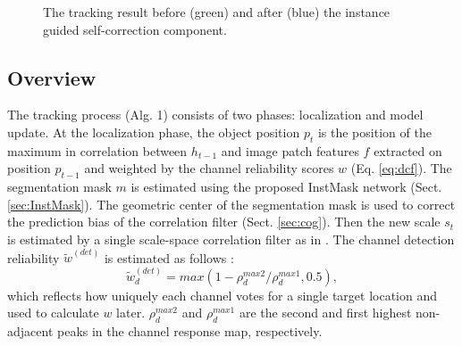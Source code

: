 \documentclass[review]{elsarticle}
\begin{document}
\begin{CJK*}{UTF8}{gbsn}
\begin{figure}
                       \hspace{-0.6em}
                       \hspace{-0.6em}
    \caption{The tracking result before (green) and after (blue) the instance guided self-correction component.}
    \label{fig:IGSC}
\end{figure}

\subsection{Overview}

The tracking process (Alg. 1) consists of two phases: localization and model update. 
At the localization phase,  the object position $p_t$ is the position of the maximum in correlation between $h_{t-1}$ and image patch features $f$ extracted on position $p_{t-1}$ and weighted by the channel reliability scores $w$ (Eq. \ref{eq:dcf}).
The segmentation mask $m$ is estimated using the proposed InstMask network (Sect. \ref{sec:InstMask}).
The geometric center of the segmentation mask is used to correct the prediction bias of the correlation filter (Sect. \ref{sec:cog}).
Then the new scale $s_t$ is estimated by a single scale-space correlation filter as in \cite{Danelljan2014AccurateSE}.
The channel detection reliability $\tilde{w}^{(det)}$ is estimated as follows \cite{Lukezic2017DiscriminativeCF}:
\begin{equation} \label{eq:det}
\tilde w_d^{(det)} = max(1 - \rho_d^{max2} / \rho_d^{max1}, 0.5),
\end{equation}
which reflects how uniquely each channel votes for a single target location and used to calculate $w$ later. $\rho_d^{max2}$ and $\rho_d^{max1}$ are the second and first highest non-adjacent peaks in the channel response map, respectively.


\end{CJK*}
\end{document}
